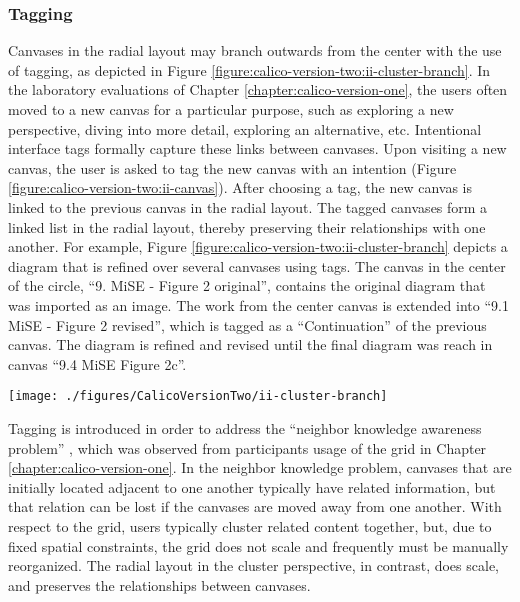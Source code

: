 \subsubsection{Tagging} 

Canvases in the radial layout may branch outwards from the center with the use of tagging, as depicted in Figure \ref{figure:calico-version-two:ii-cluster-branch}. In the laboratory evaluations of Chapter \ref{chapter:calico-version-one}, the users often moved to a new canvas for a particular purpose, such as exploring a new perspective, diving into more detail, exploring an alternative, etc. Intentional interface tags formally capture these links between canvases. Upon visiting a new canvas, the user is asked to tag the new canvas with an intention (Figure \ref{figure:calico-version-two:ii-canvas}). After choosing a tag, the new canvas is linked to the previous canvas in the radial layout. The tagged canvases form a linked list in the radial layout, thereby preserving their relationships with one another. For example, Figure \ref{figure:calico-version-two:ii-cluster-branch} depicts a diagram that is refined over several canvases using tags. The canvas in the center of the circle, ``9. MiSE - Figure 2 original'', contains the original diagram that was imported as an image. The work from the center canvas is extended into ``9.1 MiSE - Figure 2 revised'', which is tagged as a ``Continuation'' of the previous canvas. The diagram is refined and revised until the final diagram was reach in canvas ``9.4 MiSE Figure 2c''.

\begin{figure*}[tbh]
  \centering
  \texttt{[image: ./figures/CalicoVersionTwo/ii-cluster-branch]}
  \caption{A diagram is refined and revised across several canvases, which are linked ``Continuation'' and ``Alternative'' tags.}
  \label{figure:calico-version-two:ii-cluster-branch}
\end{figure*}


Tagging is introduced in order to address the ``neighbor knowledge awareness problem'' \cite{dekel2007notation}, which was observed from participants usage of the grid in Chapter \ref{chapter:calico-version-one}. In the neighbor knowledge problem, canvases that are initially located adjacent to one another typically have related information, but that relation can be lost if the canvases are moved away from one another. With respect to the grid, users typically cluster related content together, but, due to fixed spatial constraints, the grid does not scale and frequently must be manually reorganized. The radial layout in the cluster perspective, in contrast, does scale, and preserves the relationships between canvases. 

